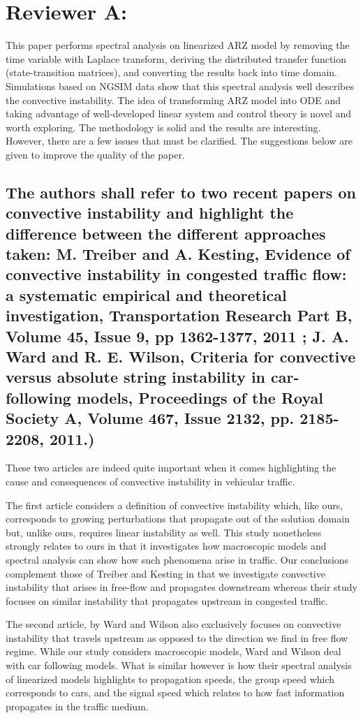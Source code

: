 \documentclass[preprint]{elsarticle}
\begin{document}
\section{Reviewer A:}

This paper performs spectral analysis on linearized ARZ model by removing the time variable with Laplace transform, deriving the distributed transfer function (state-transition matrices), and converting the results back into time domain. Simulations based on NGSIM data show that this spectral analysis well describes the convective instability. The idea of transforming ARZ model into ODE and taking advantage of well-developed linear system and control theory is novel and worth exploring. The methodology is solid and the results are interesting. However, there are a few issues that must be clarified. The suggestions below are given to improve the quality of the paper.

\subsection{
The authors shall refer to two recent papers on convective instability and highlight the difference between the different approaches taken: M. Treiber and A. Kesting, Evidence of convective instability in congested traffic flow: a systematic empirical and theoretical investigation, Transportation Research Part B, Volume 45, Issue 9, pp 1362-1377, 2011 ; J. A. Ward and R. E. Wilson, Criteria for convective versus absolute string instability in car-following models, Proceedings of the Royal Society A, Volume 467, Issue 2132, pp. 2185-2208, 2011.)
}

These two articles are indeed quite important when it comes highlighting the cause and consequences of convective instability in vehicular traffic.

The first article considers a definition of convective instability which, like ours, corresponds to growing perturbations that propagate out of the solution domain but, unlike ours, requires linear instability as well. This study nonetheless strongly relates to ours in that it investigates how macroscopic models and spectral analysis can show how such phenomena arise in traffic. Our conclusions complement those of Treiber and Kesting in that we investigate convective instability that arises in free-flow and propagates downstream whereas their study focuses on similar instability that propagates upstream in congested traffic.

The second article, by Ward and Wilson also exclusively focuses on convective instability that travels upstream as opposed to the direction we find in free flow regime. While our study considers macroscopic models, Ward and Wilson deal with car following models. What is similar however is how their spectral analysis of linearized models highlights to propagation speeds, the group speed which corresponds to cars, and the signal speed which relates to how fast information propagates in the traffic medium.
\end{document}
